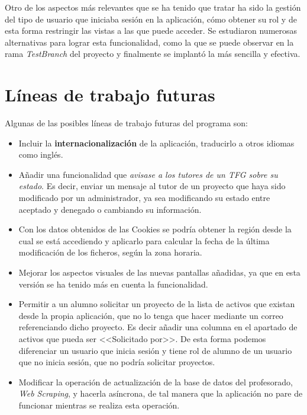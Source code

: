 Otro de los aspectos más relevantes que se ha tenido que tratar ha sido la gestión del tipo de usuario que iniciaba sesión en la aplicación, cómo obtener su rol y de esta forma restringir las vistas a las que puede acceder. Se estudiaron numerosas alternativas para lograr esta funcionalidad, como la que se puede observar en la rama \emph{TestBranch} del proyecto y finalmente se implantó la más sencilla y efectiva.

\section{Líneas de trabajo futuras}

Algunas de las posibles líneas de trabajo futuras del programa son:

\begin{itemize}
	\item Incluir la \textbf{internacionalización} de la aplicación, traducirlo a otros idiomas como inglés.
	\item Añadir una funcionalidad que \emph{avisase a los tutores de un TFG sobre su estado}. Es decir, enviar un mensaje al tutor de un proyecto que haya sido modificado por un administrador, ya sea modificando su estado entre aceptado y denegado o cambiando su información.
	\item Con los datos obtenidos de las Cookies se podría obtener la región
	desde la cual se está accediendo y aplicarlo para calcular la fecha de
	la última modificación de los ficheros, según la zona horaria.
	\item Mejorar los aspectos visuales de las nuevas pantallas añadidas, ya que en esta versión se ha tenido más en cuenta la funcionalidad.
	\item Permitir a un alumno solicitar un proyecto de la lista de activos que existan desde la propia aplicación, que no lo tenga que hacer mediante un correo referenciando dicho proyecto. Es decir añadir una columna en el apartado de activos que pueda ser <<Solicitado por>>. De esta forma podemos diferenciar un usuario que inicia sesión y tiene rol de alumno de un usuario que no inicia sesión, que no podría solicitar proyectos.
	\item Modificar la operación de actualización de la base de datos del profesorado, \emph{Web Scraping}, y hacerla asíncrona, de tal manera que la aplicación no pare de funcionar mientras se realiza esta operación.
	
\end{itemize}